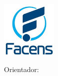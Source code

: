 
\begin{center}
	
	\center
	\includegraphics[width=0.2\textwidth]{logo_facens.png}
	\vspace{0.5cm}
	\\
	\ABNTEXchapterfont\textsc{\textbf{\MakeUppercase{\imprimirinstituicao}}}
	\vspace{3.5cm}
	
    \center
    \ABNTEXchapterfont\textsc{\MakeUppercase{\textbf{\imprimirautor}}}
	\vspace{3.5cm}
	
    \ABNTEXchapterfont\textsc{\MakeUppercase{\textbf{\imprimirtitulo\ifdef{\osubtitulo}{:}{}}}}
    
    \ifdef{\osubtitulo}{\MakeUppercase{\ABNTEXchapterfont\imprimirsubtitulo}}{}
	\vfill
	
	\center
        \normalsize
   		Orientador: \imprimirorientador
   		\vfill
	\textsc{\MakeUppercase{\textbf{\imprimirlocal}}}
	
	\textsc{\MakeUppercase{\textbf{\imprimirano}}}
	
	\vspace*{2cm}
	
\end{center}

\cleardoublepage

